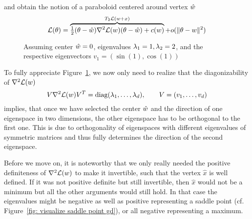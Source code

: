 %
and obtain the notion of a paraboloid centered around
vertex \(\hat{w}\)
%
\begin{align}\label{paraboloid approximation of L}
	\mathcal{L}(\theta)
	= \overbrace{
		\tfrac12 (\theta- \hat{w}) \nabla^2 \mathcal{L}(w) (\theta-\hat{w})
		+ c(w)
	}^{T_2\mathcal{L}(w+x)} + o(\|\theta-w\|^2)
\end{align}
%
\begin{wrapfigure}{O}{0.65\textwidth}
	\centering
	\def\svgwidth{0.65\textwidth}
	
	\caption{Assuming center \(\hat{w}=0\), eigenvalues \(\lambda_1=1,
	\lambda_2=2\), and the respective eigenvectors \(v_1=(\sin(1), \cos(1))\)}
	\label{fig: 2d paraboloid}
\end{wrapfigure}
%
To fully appreciate Figure~\ref{fig: 2d paraboloid}, we now only need to realize
that the diagonizability of \(\nabla^2 \mathcal{L}(w)\)
%
\begin{align}\label{eq: diagnalization of the Hesse matrix}
	V \nabla^2 \mathcal{L}(w) V^T
	= \text{diag}(\lambda_1,\dots,\lambda_d), \qquad V=(v_1,\dots, v_d)
\end{align}
%
implies, that once we have selected the center \(\hat{w}\) and the
direction of one eigenspace in two dimensions, the other eigenspace has to be
orthogonal to the first one. This is due to orthogonality of eigenspaces with
different eigenvalues of symmetric matrices and thus fully determines the
direction of the second eigenspace.

Before we move on, it is noteworthy that we only really needed the positive
definiteness of \(\nabla^2 \mathcal{L}(w)\) to make it invertible, such that the
vertex \(\hat{x}\) is well defined. If it was not positive definite but still
invertible, then \(\hat{x}\) would not be a minimum but all the other arguments
would still hold.
In that case the eigenvalues might be negative as well as positive representing
a saddle point (cf. Figure~\ref{fig: visualize saddle point gd}), or all
negative representing a maximum.

